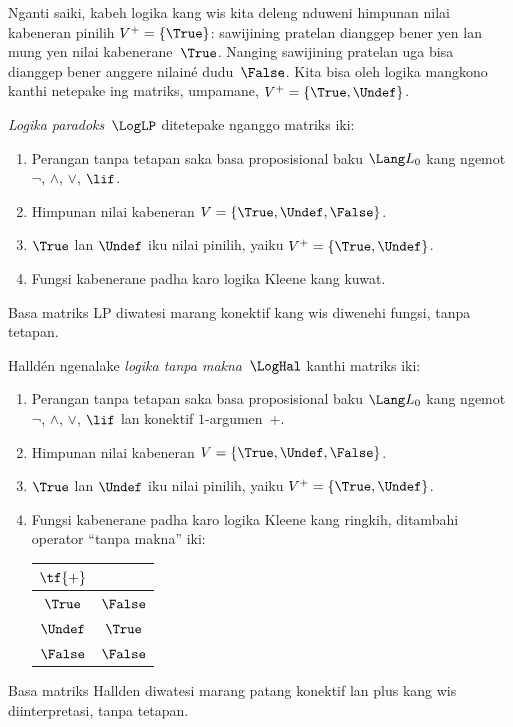 \documentclass[../../../include/open-logic-section]{subfiles}
\begin{document}


Nganti saiki, kabeh logika kang wis kita deleng nduweni himpunan
nilai kabeneran pinilih $V^+ = \{\True\}$: sawijining pratelan
dianggep bener yen lan mung yen nilai kabenerane~$\True$.
Nanging sawijining pratelan uga bisa dianggep bener anggere
nilainé dudu~$\False$. Kita bisa oleh logika mangkono kanthi
netepake ing matriks, umpamane, $V^+ = \{\True, \Undef\}$.

\begin{defn}
\emph{Logika paradoks}~$\LogLP$ ditetepake nganggo matriks iki:
\begin{enumerate}
  \item Perangan tanpa tetapan saka basa proposisional baku
  $\Lang L_0$ kang ngemot $\lnot$, $\land$, $\lor$, $\lif$.
  \item Himpunan nilai kabeneran $V = \{\True, \Undef, \False\}$.
  \item $\True$ lan $\Undef$ iku nilai pinilih, yaiku $V^+ = \{\True, \Undef\}$.
  \item Fungsi kabenerane padha karo logika Kleene kang kuwat.
\end{enumerate}
Basa matriks LP diwatesi marang konektif kang wis diwenehi fungsi, tanpa tetapan.
\end{defn}

\begin{defn}
Halld\'en ngenalake \emph{logika tanpa makna}~$\LogHal$ kanthi matriks iki:
\begin{enumerate}
  \item Perangan tanpa tetapan saka basa proposisional baku
  $\Lang L_0$ kang ngemot $\lnot$, $\land$, $\lor$, $\lif$
  lan konektif $1$-argumen~$+$.
  \item Himpunan nilai kabeneran $V = \{\True, \Undef, \False\}$.
  \item $\True$ lan $\Undef$ iku nilai pinilih, yaiku $V^+ = \{\True, \Undef\}$.
  \item Fungsi kabenerane padha karo logika Kleene kang ringkih,
  ditambahi operator ``tanpa makna'' iki:
  \begin{center}
    \begin{tabular}{c|c} 
    $\tf{+}$ & \\ 
    \hline  
    $\True$ & $\False$ \\ 
    $\Undef$ & $\True$ \\
    $\False$ & $\False$ 
    \end{tabular}
  \end{center}
\end{enumerate}
Basa matriks Hallden diwatesi marang patang konektif lan plus kang wis diinterpretasi, tanpa tetapan.
\end{defn}
\end{document}
